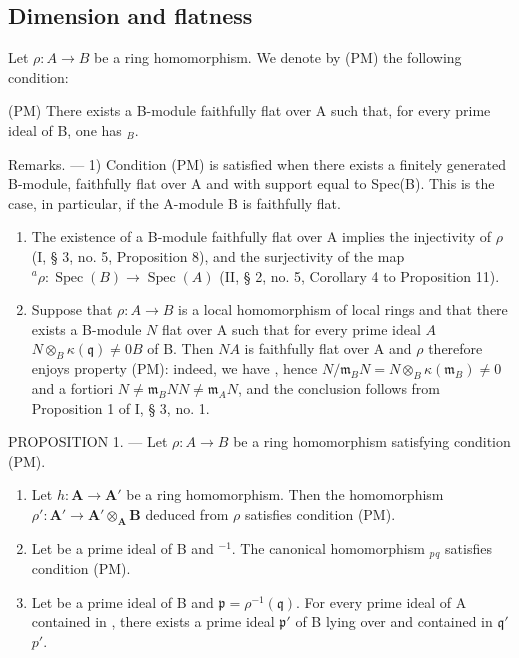 \subsection{Dimension and flatness}

Let \(\rho: A \to B\) be a ring homomorphism. We denote by (PM) the following condition:

(PM) There exists a B-module  faithfully flat over A such that, for every prime ideal  of B, one has \(_{B}\).

Remarks. --- 1) Condition (PM) is satisfied when there exists a finitely generated B-module, faithfully flat over A and with support equal to Spec(B). This is the case, in particular, if the A-module B is faithfully flat.

\begin{enumerate}
\def\labelenumi{\arabic{enumi})}
\setcounter{enumi}{1}
\item
  The existence of a B-module  faithfully flat over A implies the injectivity of \(\rho\) (I, § 3, no. 5, Proposition 8), and the surjectivity of the map \({}^{a}\rho : \operatorname{Spec}(B) \to \operatorname{Spec}(A)\) (II, § 2, no. 5, Corollary 4 to Proposition 11).
\item
  Suppose that \(\rho: A \to B\) is a local homomorphism of local rings and that there exists a B-module \(N\) flat over A such that  for every prime ideal \(A\)\(N \otimes_B \kappa(\mathfrak{q}) \neq 0\)\(B\) of B. Then \(N\)\(A\) is faithfully flat over A and \(\rho\) therefore enjoys property (PM): indeed, we have , hence \(N/\mathfrak{m}_{B}N = N \otimes_B \kappa(\mathfrak{m}_{B}) \neq 0\) and a fortiori \(N \neq \mathfrak{m}_{B}N\)\(N \neq \mathfrak{m}_{A}N\), and the conclusion follows from Proposition 1 of I, § 3, no. 1.
\end{enumerate}

PROPOSITION 1. --- Let \(\rho: A \to B\) be a ring homomorphism satisfying condition (PM).

\begin{enumerate}
\def\labelenumi{\alph{enumi})}
\item
  Let \(h: \mathbf{A} \to \mathbf{A}'\) be a ring homomorphism. Then the homomorphism \(\rho': \mathbf{A}' \to \mathbf{A}' \otimes_{\mathbf{A}} \mathbf{B}\) deduced from \(\rho\) satisfies condition (PM).
\item
  Let  be a prime ideal of B and \(^{-1}\). The canonical homomorphism \(_{p}\)\(_{q}\) satisfies condition (PM).
\item
  Let  be a prime ideal of B and \(\mathfrak{p} = \rho^{-1}(\mathfrak{q})\). For every prime ideal  of A contained in , there exists a prime ideal \(\mathfrak{p}'\) of B lying over  and contained in \(\mathfrak{q}'\)\(p'\).
\end{enumerate}

